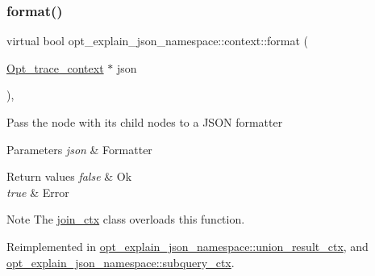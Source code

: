 \mbox{\label{classopt__explain__json__namespace_1_1context_a73e34a665c4550ba7725839ca643119d}} 
\subsubsection{\texorpdfstring{format()}{format()}}
{\footnotesize\ttfamily virtual bool opt\+\_\+explain\+\_\+json\+\_\+namespace\+::context\+::format (\begin{DoxyParamCaption}\item[{\mbox{\hyperlink{classOpt__trace__context}{Opt\+\_\+trace\+\_\+context}} $\ast$}]{json }\end{DoxyParamCaption})\hspace{0.3cm}{\ttfamily [inline]}, {\ttfamily [virtual]}}

Pass the node with its child nodes to a J\+S\+ON formatter


\begin{DoxyParams}{Parameters}
{\em json} & Formatter\\
\hline
\end{DoxyParams}

\begin{DoxyRetVals}{Return values}
{\em false} & Ok \\
\hline
{\em true} & Error\\
\hline
\end{DoxyRetVals}
\begin{DoxyNote}{Note}
The {\ttfamily \mbox{\hyperlink{classopt__explain__json__namespace_1_1join__ctx}{join\+\_\+ctx}}} class overloads this function. 
\end{DoxyNote}


Reimplemented in \mbox{\hyperlink{classopt__explain__json__namespace_1_1union__result__ctx_ad9dbb8c384b4cc802656fed173589e5c}{opt\+\_\+explain\+\_\+json\+\_\+namespace\+::union\+\_\+result\+\_\+ctx}}, and \mbox{\hyperlink{classopt__explain__json__namespace_1_1subquery__ctx_ab09c364c9a8a64f548140c8035309dc6}{opt\+\_\+explain\+\_\+json\+\_\+namespace\+::subquery\+\_\+ctx}}.

\mbox{\label{classopt__explain__json__namespace_1_1context_ab1aae5d8b971fc1fd381c68f592b0838}} 

